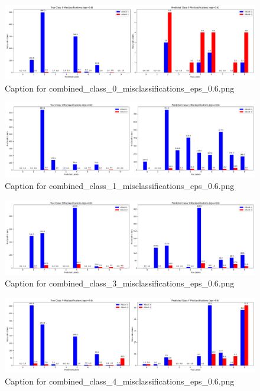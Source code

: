 \documentclass[11pt,onside]{article}
\begin{document}
\begin{figure}[ht]
\centering
\includegraphics[width=1\textwidth]{combined_class_boundary_pgd/combined_class_0_misclassifications_eps_0.6.png}
\caption{Caption for combined_class_0_misclassifications_eps_0.6.png}
\label{fig:combined_class_0_misclassifications_eps_0.6.png}
\end{figure}

\begin{figure}[ht]
\centering
\includegraphics[width=1\textwidth]{combined_class_boundary_pgd/combined_class_1_misclassifications_eps_0.6.png}
\caption{Caption for combined_class_1_misclassifications_eps_0.6.png}
\label{fig:combined_class_1_misclassifications_eps_0.6.png}
\end{figure}

\begin{figure}[ht]
\centering
\includegraphics[width=1\textwidth]{combined_class_boundary_pgd/combined_class_3_misclassifications_eps_0.6.png}
\caption{Caption for combined_class_3_misclassifications_eps_0.6.png}
\label{fig:combined_class_3_misclassifications_eps_0.6.png}
\end{figure}

\begin{figure}[ht]
\centering
\includegraphics[width=1\textwidth]{combined_class_boundary_pgd/combined_class_4_misclassifications_eps_0.6.png}
\caption{Caption for combined_class_4_misclassifications_eps_0.6.png}
\label{fig:combined_class_4_misclassifications_eps_0.6.png}
\end{figure}
\end{document}
